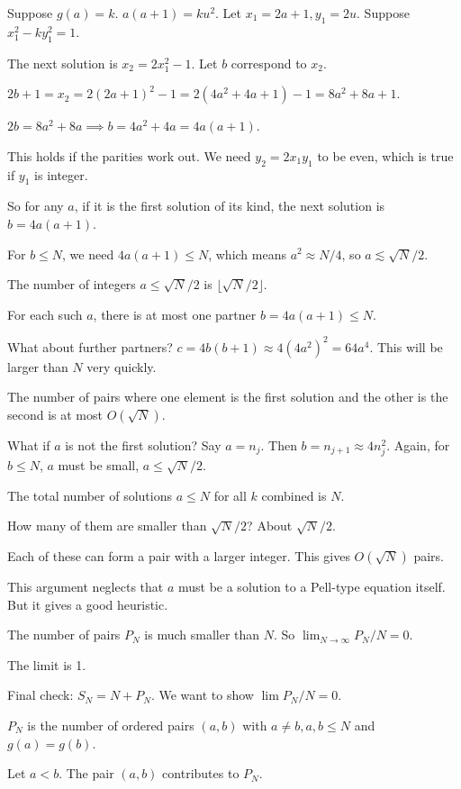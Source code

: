 \documentclass[12pt,a4paper]{article}
\theoremstyle{definition}
\begin{document}
    Suppose $g(a)=k$. $a(a+1)=ku^2$. Let $x_1=2a+1, y_1=2u$. Suppose $x_1^2-ky_1^2=1$.

    The next solution is $x_2=2x_1^2-1$. Let $b$ correspond to $x_2$.

    $2b+1=x_2=2(2a+1)^2-1 = 2(4a^2+4a+1)-1 = 8a^2+8a+1$.

    $2b=8a^2+8a \implies b=4a^2+4a=4a(a+1)$.

    This holds if the parities work out. We need $y_2=2x_1y_1$ to be even, which is true if $y_1$ is integer.

    So for any $a$, if it is the first solution of its kind, the next solution is $b=4a(a+1)$.

    For $b \leq N$, we need $4a(a+1) \leq N$, which means $a^2 \approx N/4$, so $a \lesssim \sqrt{N}/2$.

    The number of integers $a \leq \sqrt{N}/2$ is $\lfloor \sqrt{N}/2 \rfloor$.

    For each such $a$, there is at most one partner $b=4a(a+1) \leq N$.

    What about further partners? $c=4b(b+1) \approx 4(4a^2)^2 = 64 a^4$. This will be larger than $N$ very quickly.

    The number of pairs where one element is the first solution and the other is the second is at most $O(\sqrt{N})$.

    What if $a$ is not the first solution? Say $a=n_j$. Then $b=n_{j+1} \approx 4n_j^2$. Again, for $b \leq N$, $a$ must be small, $a \leq \sqrt{N}/2$.

    The total number of solutions $a \leq N$ for all $k$ combined is $N$.

    How many of them are smaller than $\sqrt{N}/2$? About $\sqrt{N}/2$.

    Each of these can form a pair with a larger integer. This gives $O(\sqrt{N})$ pairs.

    This argument neglects that $a$ must be a solution to a Pell-type equation itself. But it gives a good heuristic.

    The number of pairs $P_N$ is much smaller than $N$. So $\lim_{N\to\infty} P_N/N = 0$.

    The limit is 1.

    Final check:
    $S_N = N + P_N$. We want to show $\lim P_N/N = 0$.

    $P_N$ is the number of ordered pairs $(a,b)$ with $a \neq b, a,b \leq N$ and $g(a)=g(b)$.

    Let $a<b$. The pair $(a,b)$ contributes to $P_N$.
\end{document}
